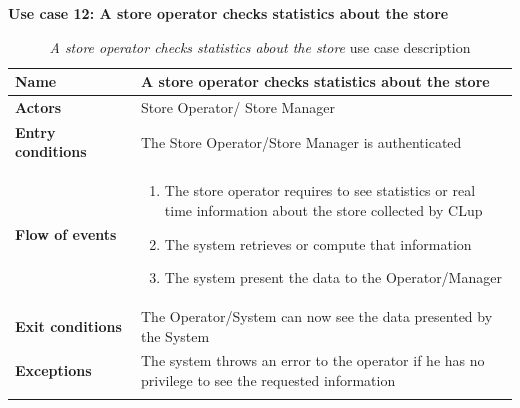 \clearpage
\textbf{Use case 12: A store operator checks statistics about the store}
\smallskip
{}
\begin{longtable}{p{0.25\linewidth}p{0.75\linewidth}}
    \toprule
    \textbf{Name}             & \textbf{A store operator checks statistics about the store}                                        \\
    \midrule
    \textbf{Actors}           & Store Operator/ Store Manager                                                                      \\
    \midrule
    \textbf{Entry conditions} & The Store Operator/Store Manager is authenticated                                                  \\
    \midrule
    \textbf{Flow of events}   &
    \begin{enumerate}
        \item The store operator requires to see statistics or real time information about the store collected by CLup
        \item The system retrieves or compute that information
        \item The system present the data to the Operator/Manager
    \end{enumerate}                                                                                                     \\
    \midrule
    \textbf{Exit conditions}  & The Operator/System can now see the data presented by the System                                   \\
    \midrule
    \textbf{Exceptions}       & The system throws an error to the operator if he has no privilege to see the requested information \\
    \bottomrule
    \caption{\emph{A store operator checks statistics about the store} use case description}
\end{longtable}


